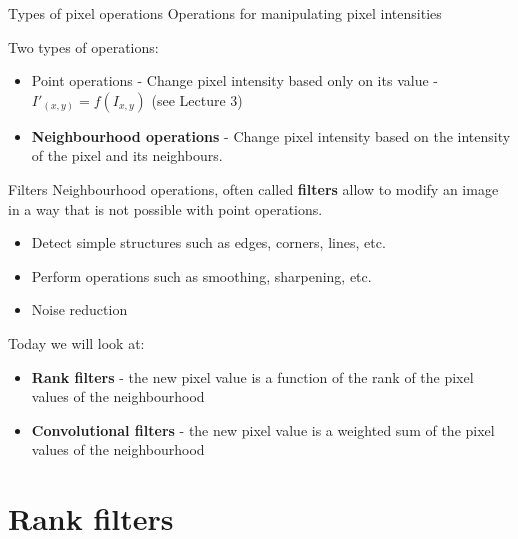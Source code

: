 \documentclass[9pt, aspectratio=169]{beamer}
\begin{document}
\begin{frame}
\begin{columns}
\begin{column}{0.2\textwidth}
        \end{column}
    \end{columns}
\end{frame}

\begin{frame}
    {Types of pixel operations}
    Operations for manipulating pixel intensities

    Two types of operations:
    \begin{itemize}
        \item Point operations - Change pixel intensity based only on its value - $I'_{(x, y)} = f(I_{x, y})$ (see Lecture 3)
        \item \textbf{Neighbourhood operations} - Change pixel intensity based on the intensity of the pixel and its neighbours.
    \end{itemize}
\end{frame}

\begin{frame}
    {Filters}
    Neighbourhood operations, often called \textbf{filters} allow to modify an image in a way that is not possible with point operations.

    \begin{itemize}
        \item Detect simple structures such as edges, corners, lines, etc.
        \item Perform operations such as smoothing, sharpening, etc.
        \item Noise reduction
    \end{itemize}
    \pause
    Today we will look at:
    \begin{itemize}
        \item \textbf{Rank filters} - the new pixel value is a function of the rank of the pixel values of the neighbourhood
        \item \textbf{Convolutional filters} - the new pixel value is a weighted sum of the pixel values of the neighbourhood
    \end{itemize}

\end{frame}

\section{Rank filters}
\end{document}
